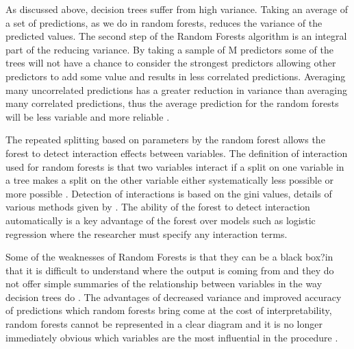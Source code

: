 \documentclass[11pt,a4paper]{article}
\begin{document}
As discussed above, decision trees suffer from high variance. Taking an average of a set of predictions, as we do in random forests, reduces the variance of the predicted values. The second step of the Random Forests algorithm is an integral part of the reducing variance. By taking a sample of M predictors some of the trees will not have a chance to consider the strongest predictors allowing other predictors to add some value and results in less correlated predictions. Averaging many uncorrelated predictions has a greater reduction in variance than averaging many correlated predictions, thus the average prediction for the random forests will be less variable and more reliable \citep{james13}.

The repeated splitting based on parameters by the random forest allows the forest to detect interaction effects between variables. The definition of interaction used for random forests is that two variables interact if a split on one variable in a tree makes a split on the other variable either systematically less possible or more possible \citep{breiman01}. Detection of interactions is based on the gini values,  details of various methods given by \citet{kelly12}. The ability of the forest to detect interaction automatically is a key advantage of the forest over models such as logistic regression where the researcher must specify any interaction terms.

Some of the weaknesses of Random Forests is that they can be a black box?in that it is difficult to understand where the output is coming from and they do not offer simple summaries of the relationship between variables in the way decision trees do \citep{varian14}. The advantages of decreased variance and improved accuracy of predictions which random forests bring come at the cost of interpretability, random forests cannot be represented in a clear diagram and it is no longer immediately obvious which variables are the most influential in the procedure \citep{james13}.
\end{document}
